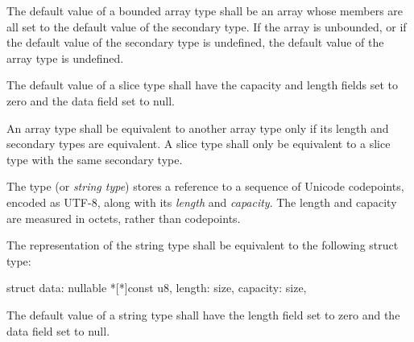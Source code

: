 \specsubsubitem
The default value of a bounded array type shall be an array whose
members are all set to the default value of the secondary type. If the array is
unbounded, or if the default value of the secondary type is undefined, the
default value of the array type is undefined.

\specsubsubitem
The default value of a slice type shall have the capacity and length fields set
to zero and the data field set to null.

\specsubsubitem
An array type shall be equivalent to another array type only if its length and
secondary types are equivalent. A slice type shall only be equivalent to a
slice type with the same secondary type.


\specsubsubitem
The  type (or \textit{string type}) stores a reference to a
sequence of Unicode codepoints, encoded as \hbox{UTF-8}, along with its
\textit{length} and \textit{capacity}. The length and capacity are measured in
octets, rather than codepoints.

\specsubsubitem
The representation of the string type shall be equivalent to the following
struct type:

\begin{codesample}
struct {
	data: nullable *[*]const u8,
	length: size,
	capacity: size,
}
\end{codesample}

\specsubsubitem
The default value of a string type shall have the length field set to zero and
the data field set to null.


\begin{grammar}
 \\
	  \\

 \\
	\terminal{(}  \terminal{)}  \\

 \\
	 \optional{\terminal{,}} \\
	  \\
	 \terminal{,}  \\
	 \\

 \\
	 \\
	 \terminal{,}  \\

 \\
	 \terminal{:}  \\
	 \\
\end{grammar}

